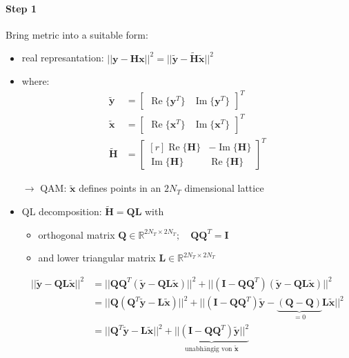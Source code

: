 \documentclass[a4paper, 10pt]{article}
\begin{document}
\paragraph{Step 1}
Bring metric into a suitable form:
\begin{itemize}
	\item real represantation: $||\mathbf{y} - \mathbf{Hx}||^2 = ||\tilde{\mathbf{y}} - \tilde{\mathbf{H}}\tilde{\mathbf{x}}||^2 $
	\item where:
	\begin{align*}
		\tilde{\mathbf{y}} &= \begin{bmatrix*} \operatorname{Re}\{\mathbf{y}^T\} & \operatorname{Im}\{\mathbf{y}^T \}	\end{bmatrix*}^T \\
		\tilde{\mathbf{x}} &= \begin{bmatrix*} \operatorname{Re}\{\mathbf{x}^T\} & \operatorname{Im}\{\mathbf{x}^T \}	\end{bmatrix*}^T \\
		\tilde{\mathbf{H}} &= \begin{bmatrix*}[r] \operatorname{Re}\{\mathbf{H}\} & -\operatorname{Im}\{\mathbf{H} \} \\ \operatorname{Im}\{ \mathbf{H}\} &\operatorname{Re}\{\mathbf{H} \}\end{bmatrix*}^T 		
	\end{align*}
	\item[$\rightarrow$] QAM: $\tilde{\mathbf{x}}$ defines points in an $ 2N_T $ dimensional lattice
	\item QL decomposition: $ \tilde{\mathbf{H}} = \mathbf{QL} $ with
	\begin{itemize}
		\item orthogonal matrix $\mathbf{Q} \in\mathbb{R} ^{2N_T\times 2N_T};\quad \mathbf{QQ}^T = \mathbf{I}$ 
		\item and lower triangular matrix $\mathbf{L} \in \mathbb{R} ^{2N_T\times2N_T}$	
	\end{itemize}
	\begin{align*}
		||\tilde{\mathbf{y}} - \mathbf{QL}\tilde{\mathbf{x}}||^2 &= 
		||\mathbf{QQ}^T(\tilde{\mathbf{y}} - \mathbf{QL}\tilde{\mathbf{x}})||^2 + ||(\mathbf{I} - \mathbf{QQ}^T)(\tilde{\mathbf{y}} - \mathbf{QL}\tilde{\mathbf{x}})||^2 \\ 
		&= ||\mathbf{Q}(\mathbf{Q}^T\tilde{\mathbf{y}} - \mathbf{L}\tilde{\mathbf{x}})||^2 + ||(\mathbf{I} - \mathbf{QQ}^T)\tilde{\mathbf{y}} - \underbrace{(\mathbf{Q} - \mathbf{Q})}_{ = 0}\mathbf{L}\tilde{\mathbf{x}}||^2 \\ &= ||\mathbf{Q}^T\tilde{\mathbf{y}} - \mathbf{L}\tilde{\mathbf{x}}||^2 + \underbrace{||(\mathbf{I} - \mathbf{QQ}^T)\tilde{\mathbf{y}}||^2}_{\text{unabh\"angig von }\tilde{\mathbf{x}}}

\end{align*}
\end{itemize}
\end{document}
